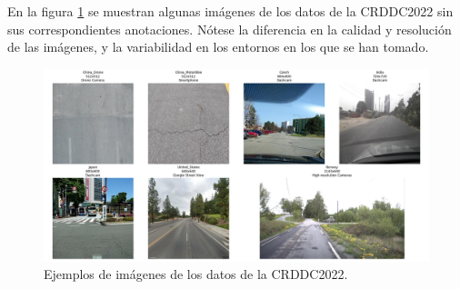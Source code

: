 En la figura \ref{fig:example_images_region} se muestran algunas imágenes de los datos de la CRDDC2022 sin sus correspondientes anotaciones. Nótese la diferencia en la calidad y resolución de las imágenes, y la variabilidad en los entornos en los que se han tomado.

\begin{figure}[H]
    \centering
    \includegraphics[width=1\textwidth]{img/example_images_regions.png}
    \caption{Ejemplos de imágenes de los datos de la CRDDC2022.}
    \label{fig:example_images_region}
\end{figure}